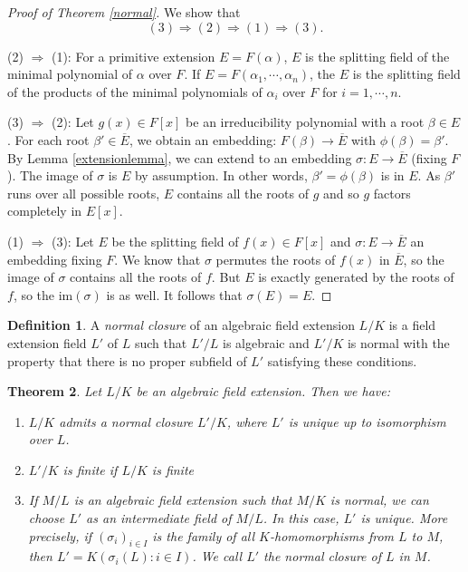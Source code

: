 \documentclass[12pt]{report}
\newtheorem{thm}{Theorem}[section]
\theoremstyle{definition}
\newtheorem{defn}[thm]{Definition}
\def\im{\text{im}}
\def\aa{\alpha}
\def\bb{\beta}
\begin{document}
\begin{proof}[Proof of Theorem \ref{normal}] We show that $$(3)\Longrightarrow(2)\Longrightarrow (1)\Longrightarrow (3).$$
    
    (2) $\Longrightarrow$ (1): For a primitive extension $E=F(\alpha)$, $E$ is the splitting field of the minimal polynomial of $\alpha$ over $F$. If $E=F(\aa_1,\cdots,\aa_n)$, the $E$ is the splitting field of the products of the minimal polynomials of $\aa_i$ over $F$ for $i=1,\cdots,n$.

    (3) $\Longrightarrow$ (2): Let $g(x)\in F[x]$ be an irreducibility polynomial with a root $\bb\in E$. For each root $\beta'\in \overline{E}$, we obtain an embedding: $F(\beta) \to \overline{E}$ with $\phi(\bb)=\bb'$. By Lemma \ref{extensionlemma}, we can extend to an embedding $\sigma: E\to \overline{E}$ (fixing $F$). The image of $\sigma$ is $E$ by assumption. In other words, $\bb'=\phi(\bb)$ is in $E$. As $\bb'$ runs over all possible roots, $E$ contains all the roots of $g$ and so $g$ factors completely in $E[x]$.

    (1) $\Longrightarrow$ (3): Let $E$ be the splitting field of $f(x)\in F[x]$ and $\sigma: E\to\overline{E}$ an embedding fixing $F$. We know that $\sigma$ permutes the roots of $f(x)$ in $\overline{E}$, so the image of $\sigma$ contains all the roots of $f$. But $E$ is exactly generated by the roots of $f$, so the $\im(\sigma)$ is as well. It follows that $\sigma(E)=E$.
\end{proof}

\begin{defn}
    A \emph{normal closure} of an algebraic field extension $L/K$ is a field extension field $L'$ of $L$ such that $L'/L$ is algebraic and $L'/K$ is normal with the property that there is no proper subfield of $L'$ satisfying these conditions.
\end{defn}

\begin{thm}\label{normalclosure}
    Let $L/K$ be an algebraic field extension. Then we have:
    \begin{enumerate}
        \item $L/K$ admits a normal closure $L'/K$, where $L'$ is unique up to isomorphism over $L$.
        \item $L'/K$ is finite if $L/K$ is finite
        \item If $M/L$ is an algebraic field extension such that $M/K$ is normal, we can choose $L'$ as an intermediate field of $M/L$. In this case, $L'$ is unique. More precisely, if $(\sigma_i)_{i\in I}$ is the family of all $K$-homomorphisms from $L$ to $M$, then $L' = K(\sigma_i(L): i \in I)$. We call $L'$ the normal closure of $L$ in $M$.
    \end{enumerate}
\end{thm}
\end{document}
